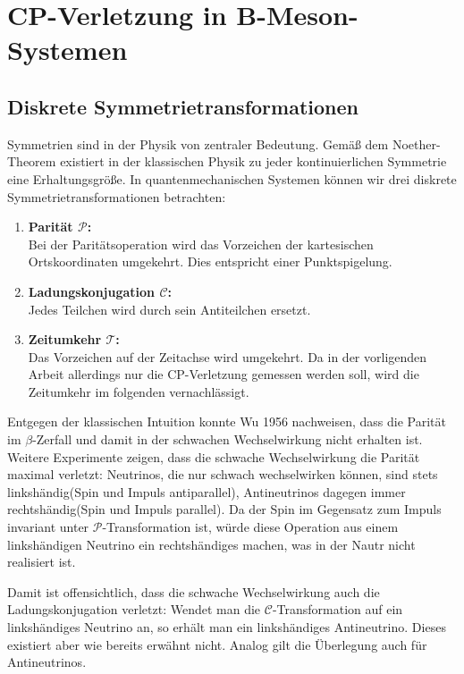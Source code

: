 \documentclass[a4paper]{scrbook}
\begin{document}



\chapter{CP-Verletzung in B-Meson-Systemen}
\section{Diskrete Symmetrietransformationen}
Symmetrien sind in der Physik von zentraler Bedeutung. Gemäß dem Noether-Theorem existiert in der klassischen Physik zu jeder kontinuierlichen Symmetrie eine Erhaltungsgröße. In quantenmechanischen Systemen können wir drei diskrete Symmetrietransformationen betrachten:
\begin{enumerate}
\item \textbf{Parität $\mathcal{P}$:} \\
      Bei der Paritätsoperation wird das Vorzeichen der kartesischen Ortskoordinaten umgekehrt. Dies entspricht einer Punktspigelung.
\item \textbf{Ladungskonjugation $\mathcal{C}$:} \\
      Jedes Teilchen wird durch sein Antiteilchen ersetzt.
\item \textbf{Zeitumkehr $\mathcal{T}$:} \\
      Das Vorzeichen auf der Zeitachse wird umgekehrt. Da in der vorligenden Arbeit allerdings nur die CP-Verletzung gemessen werden soll, wird die Zeitumkehr im folgenden vernachlässigt.
\end{enumerate}
Entgegen der klassischen Intuition konnte Wu 1956 nachweisen, dass die Parität im $\beta$-Zerfall und damit in der schwachen Wechselwirkung nicht erhalten ist. Weitere Experimente zeigen, dass die schwache Wechselwirkung die Parität maximal verletzt: Neutrinos, die nur schwach wechselwirken können, sind stets \glqq linkshändig\grqq (Spin und Impuls antiparallel), Antineutrinos dagegen immer \glqq rechtshändig\grqq (Spin und Impuls parallel). Da der Spin im Gegensatz zum Impuls invariant unter $\mathcal{P}$-Transformation ist, würde diese Operation aus einem linkshändigen Neutrino ein rechtshändiges machen, was in der Nautr nicht realisiert ist.

Damit ist offensichtlich, dass die schwache Wechselwirkung auch die Ladungskonjugation verletzt: Wendet man die $\mathcal{C}$-Transformation auf ein linkshändiges Neutrino an, so erhält man ein linkshändiges Antineutrino. Dieses existiert aber wie bereits erwähnt nicht. Analog gilt die Überlegung auch für Antineutrinos.
\end{document}
